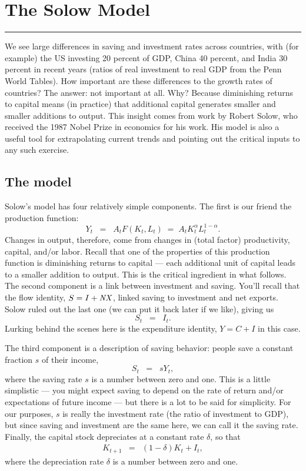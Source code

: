 \chapter{The Solow Model}\label{chp:solo}
\hypertarget{solow}{}


\rule{\textwidth}{1pt}

We see large differences in saving and investment rates across
countries, with (for example) the US investing 20 percent of GDP,
China 40 percent, and India 30 percent in recent years
(ratios of real investment to real GDP from the Penn World Tables).
How important are these differences to the growth rates of countries?
The answer:  not important at all.
Why?  Because diminishing returns to capital means
(in practice) that additional capital generates smaller and smaller
additions to output.
This insight comes from work by Robert Solow,
who received the 1987 Nobel Prize in economics for his work.
His model is also a useful tool for extrapolating current trends
and pointing out the critical inputs to any such exercise.


\section{The model}
%
Solow's model has four relatively simple components. 
The first is our friend the production function:
\begin{equation}
    Y_t \;\;=\;\; A_tF(K_t,L_t) \;=\; A_t K_t^{\alpha} L_t^{1-\alpha}.
        \label{eq:pf_solow}
\end{equation}
Changes in output, therefore, come from changes in
(total factor) productivity, capital, and/or labor.
Recall that one of the properties of this production function
is diminishing returns to capital --- each additional unit of capital leads to a smaller addition to output.
This is the critical ingredient in what follows.
The second component is a link between investment and saving.
You'll recall that the flow identity,
$  S = I + \mbox{\em NX\/} $,
linked saving to investment and net exports.
Solow ruled out the last one (we can put it back later if we like),
giving us
\[
    S_t \;\;=\;\; I_t.
\]
Lurking behind the scenes here is the expenditure identity,
$ Y = C + I$ in this case.

The third component is a description of saving behavior:
people save a constant fraction $s$ of their income,
\[
    S_t \;\;=\;\; sY_t,
\]
where the saving rate $s$ is a number between zero and one.
This is a little simplistic --- you might expect saving to depend on
the rate of return and/or expectations of future income --- but there is a lot to be said for simplicity.
For our purposes, $s$ is really the investment rate (the ratio of
investment to GDP), but since saving and investment are the same
here, we can call it the saving rate.
Finally, the capital stock depreciates at a constant rate $\delta$,
so that
\begin{eqnarray}
    K_{t+1} &=& (1-\delta) K_t + I_t ,
    \label{eq:k}
\end{eqnarray}
where the depreciation rate $\delta$ is a number between zero and one.


